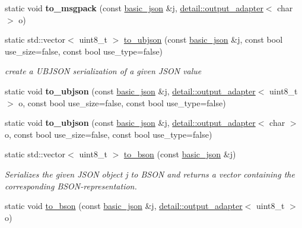 \begin{DoxyCompactItemize}
\mbox{\label{classnlohmann_1_1basic__json_a99efe44b502de2762a433ce3688ec2d2}} 
static void {\bfseries to\+\_\+msgpack} (const \mbox{\hyperlink{classnlohmann_1_1basic__json}{basic\+\_\+json}} \&j, \mbox{\hyperlink{classnlohmann_1_1detail_1_1output__adapter}{detail\+::output\+\_\+adapter}}$<$ char $>$ o)
\item 
static std\+::vector$<$ uint8\+\_\+t $>$ \mbox{\hyperlink{classnlohmann_1_1basic__json_ae1ece6c2059114eac10873f13ef19185}{to\+\_\+ubjson}} (const \mbox{\hyperlink{classnlohmann_1_1basic__json}{basic\+\_\+json}} \&j, const bool use\+\_\+size=false, const bool use\+\_\+type=false)
\begin{DoxyCompactList}\small\item\em create a U\+B\+J\+S\+ON serialization of a given J\+S\+ON value \end{DoxyCompactList}\item 
\mbox{\label{classnlohmann_1_1basic__json_a480f6d5a30b9627b55831178266575a7}} 
static void {\bfseries to\+\_\+ubjson} (const \mbox{\hyperlink{classnlohmann_1_1basic__json}{basic\+\_\+json}} \&j, \mbox{\hyperlink{classnlohmann_1_1detail_1_1output__adapter}{detail\+::output\+\_\+adapter}}$<$ uint8\+\_\+t $>$ o, const bool use\+\_\+size=false, const bool use\+\_\+type=false)
\item 
\mbox{\label{classnlohmann_1_1basic__json_af66db22ad819346a688042a9da68ee5f}} 
static void {\bfseries to\+\_\+ubjson} (const \mbox{\hyperlink{classnlohmann_1_1basic__json}{basic\+\_\+json}} \&j, \mbox{\hyperlink{classnlohmann_1_1detail_1_1output__adapter}{detail\+::output\+\_\+adapter}}$<$ char $>$ o, const bool use\+\_\+size=false, const bool use\+\_\+type=false)
\item 
static std\+::vector$<$ uint8\+\_\+t $>$ \mbox{\hyperlink{classnlohmann_1_1basic__json_a8ca5dd4f18b59e7022b04fd9bf7f5176}{to\+\_\+bson}} (const \mbox{\hyperlink{classnlohmann_1_1basic__json}{basic\+\_\+json}} \&j)
\begin{DoxyCompactList}\small\item\em Serializes the given J\+S\+ON object {\ttfamily j} to B\+S\+ON and returns a vector containing the corresponding B\+S\+O\+N-\/representation. \end{DoxyCompactList}\item 
static void \mbox{\hyperlink{classnlohmann_1_1basic__json_a51df13f73a970da95c3dcb3d47b0c2c4}{to\+\_\+bson}} (const \mbox{\hyperlink{classnlohmann_1_1basic__json}{basic\+\_\+json}} \&j, \mbox{\hyperlink{classnlohmann_1_1detail_1_1output__adapter}{detail\+::output\+\_\+adapter}}$<$ uint8\+\_\+t $>$ o)

\end{DoxyCompactItemize}
